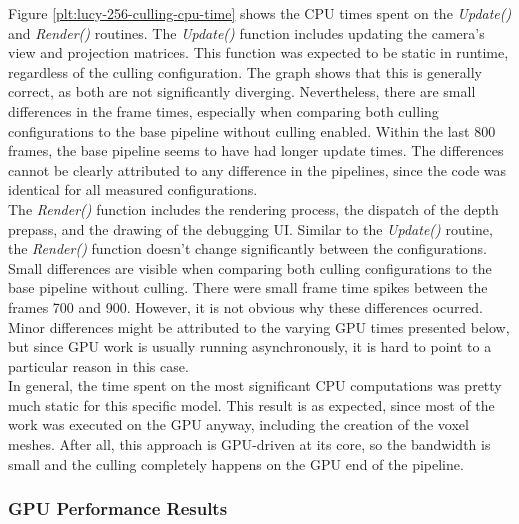 \noindent
Figure \ref{plt:lucy-256-culling-cpu-time} shows the \ac{CPU} times spent on the \emph{Update()} and \emph{Render()}
routines. The \emph{Update()} function includes updating the camera's view and projection matrices. This function was 
expected to be static in runtime, regardless of the culling configuration. The graph shows that this is generally 
correct, as both are not significantly diverging. Nevertheless, there are small differences in the frame times, 
especially when comparing both culling configurations to the base pipeline without culling enabled. Within the last 
800 frames, the base pipeline seems to have had longer update times. The differences cannot be clearly attributed to 
any difference in the pipelines, since the code was identical for all measured configurations. \\

\noindent
The \emph{Render()} function includes the rendering process, the dispatch of the depth prepass, and the drawing of the 
debugging \ac{UI}. Similar to the \emph{Update()} routine, the \emph{Render()} function doesn't change significantly 
between the configurations. Small differences are visible when comparing both culling configurations to the base 
pipeline without culling. There were small frame time spikes between the frames 700 and 900. However, it is not obvious 
why these differences ocurred. Minor differences might be attributed to the varying \ac{GPU} times presented below, but 
since \ac{GPU} work is usually running asynchronously, it is hard to point to a particular reason in this case. \\

\noindent
In general, the time spent on the most significant \ac{CPU} computations was pretty much static for this specific 
model. This result is as expected, since most of the work was executed on the \ac{GPU} anyway, including the creation 
of the voxel meshes. After all, this approach is \ac{GPU}-driven at its core, so the bandwidth is small and the culling 
completely happens on the \ac{GPU} end of the pipeline.

\subsubsection*{GPU Performance Results} \label{subsubsec-gpu-performance-results-lucy}

